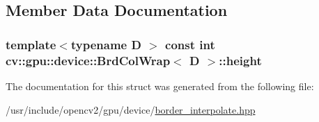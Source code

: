 \subsection{Member Data Documentation}
\hypertarget{structcv_1_1gpu_1_1device_1_1BrdColWrap_aef413433cca7a32f3aabe8aa1b578b84}{
\subsubsection[{height}]{\setlength{\rightskip}{0pt plus 5cm}template$<$typename D $>$ const int {\bf cv\-::gpu\-::device\-::\-Brd\-Col\-Wrap}$<$ D $>$\-::height}}\label{structcv_1_1gpu_1_1device_1_1BrdColWrap_aef413433cca7a32f3aabe8aa1b578b84}


The documentation for this struct was generated from the following file\-:\begin{DoxyCompactItemize}
\item 
/usr/include/opencv2/gpu/device/\hyperlink{border__interpolate_8hpp}{border\-\_\-interpolate.\-hpp}\end{DoxyCompactItemize}
